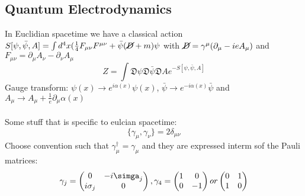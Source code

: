 \documentclass{article}
\begin{document}
    \subsection{Quantum Electrodynamics}
    In Euclidian spacetime we have a classical action $S[\psi, \bar \psi, A] = \int d^4 x ( \frac{1}{4} F_{\mu \nu} F^{\mu \nu} + \bar \psi ( \cancel D + m) \psi$ with $\cancel D = \gamma^{\mu}( \partial_{\mu} - ie A_{\mu})$ and $F_{\mu \nu} = \partial_{\mu} A_{\nu} - \partial_{\nu} A_{\mu}$
    $$
    Z = \int \mathfrak{D} \psi \mathfrak{D} \bar \psi \mathfrak{D} A e^{- S[ \psi, \bar \psi, A]}
    $$
     Gauge transform: $\psi(x) \rightarrow e^{i \alpha(x)} \psi(x)$, $\bar \psi \rightarrow e^{-i \alpha(x)} \bar \psi$ and $A_{\mu} \rightarrow A_{\mu} + \frac{1}{e} \partial_{\mu} \alpha(x)$
     \\\\
     Some stuff that is specific to eulcian spacetime:
     $$
      \{ \gamma_{\mu}, \gamma_{\nu} \} = 2 \delta_{\mu \nu}
     $$
      Choose convention such that $\gamma_{\mu}^{\dagger} = \gamma_{\mu}$ and they are expressed interm sof the Pauli matrices:
      $$
       \gamma_j = \begin{pmatrix} 0 & - i \simga_j \\ i \sigma_j & 0 \end{pmatrix}, \gamma_4 = \begin{pmatrix} 1 & 0 \\ 0 & -1 \end{pmatrix} or \begin{pmatrix} 0 & 1 \\ 1 & 0 \end{pmatrix}
      $$
\end{document}
